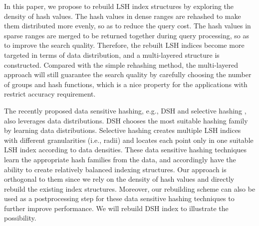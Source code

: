 In this paper, we propose to rebuild LSH index structures by exploring the density of hash values. The hash values in dense ranges are rehashed to make them distributed more evenly, so as to reduce the query cost. The hash values in sparse ranges are merged to be returned together during query processing, so as to improve the search quality. Therefore, the rebuilt LSH indices become more targeted in terms of data distribution, and a multi-layered structure is constructed. Compared with the simple rehashing method, the multi-layered approach will still guarantee the search quality by carefully choosing the number of groups and hash functions, which is a nice property for the applications with restrict accuracy requirement.





 The recently proposed data sensitive hashing, e.g., DSH \cite{Gao:2014:DDS:2588555.2588565} and selective hashing \cite{Gao:2015:SHC:2783258.2783284}, also leverages data distributions. DSH \cite{Gao:2014:DDS:2588555.2588565} chooses the most suitable hashing family by learning data distributions. Selective hashing \cite{Gao:2015:SHC:2783258.2783284} creates multiple LSH indices with different granularities (i.e., radii) and locates each point only in one suitable LSH index according to data densities. These data sensitive hashing techniques learn the appropriate hash families from the data, and accordingly have the ability to create relatively balanced indexing structures. Our approach is orthogonal to them since we rely on the density of hash values and directly rebuild the existing index structures. Moreover, our rebuilding scheme can also be used as a postprocessing step for these data sensitive hashing techniques to further improve performance. We will rebuild DSH index to illustrate the possibility.


